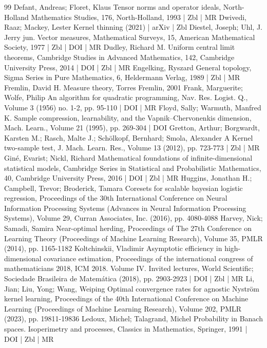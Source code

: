 \begin{thebibliography}{99}
Defant, Andreas; Floret, Klaus Tensor norms and operator ideals, North-Holland Mathematics Studies, 176, North-Holland, 1993 | Zbl | MR
Dwivedi, Raaz; Mackey, Lester Kernel thinning (2021) | arXiv | Zbl
Diestel, Joseph; Uhl, J. Jerry jun. Vector measures, Mathematical Surveys, 15, American Mathematical Society, 1977 | Zbl | DOI | MR
Dudley, Richard M. Uniform central limit theorems, Cambridge Studies in Advanced Mathematics, 142, Cambridge University Press, 2014 | DOI | Zbl | MR
Engelking, Ryszard General topology, Sigma Series in Pure Mathematics, 6, Heldermann Verlag, 1989 | Zbl | MR
Fremlin, David H. Measure theory, Torres Fremlin, 2001
Frank, Marguerite; Wolfe, Philip An algorithm for quadratic programming, Nav. Res. Logist. Q., Volume 3 (1956) no. 1-2, pp. 95-110 | DOI | MR
Floyd, Sally; Warmuth, Manfred K. Sample compression, learnability, and the Vapnik–Chervonenkis dimension, Mach. Learn., Volume 21 (1995), pp. 269-304 | DOI
Gretton, Arthur; Borgwardt, Karsten M.; Rasch, Malte J.; Schölkopf, Bernhard; Smola, Alexander A Kernel two-sample test, J. Mach. Learn. Res., Volume 13 (2012), pp. 723-773 | Zbl | MR
Giné, Evarist; Nickl, Richard Mathematical foundations of infinite-dimensional statistical models, Cambridge Series in Statistical and Probabilistic Mathematics, 40, Cambridge University Press, 2016 | DOI | Zbl | MR
Huggins, Jonathan H.; Campbell, Trevor; Broderick, Tamara Coresets for scalable bayesian logistic regression, Proceedings of the 30th International Conference on Neural Information Processing Systems (Advances in Neural Information Processing Systems), Volume 29, Curran Associates, Inc. (2016), pp. 4080-4088
Harvey, Nick; Samadi, Samira Near-optimal herding, Proceedings of The 27th Conference on Learning Theory (Proceedings of Machine Learning Research), Volume 35, PMLR (2014), pp. 1165-1182
Koltchinskii, Vladimir Asymptotic efficiency in high-dimensional covariance estimation, Proceedings of the international congress of mathematicians 2018, ICM 2018. Volume IV. Invited lectures, World Scientific; Sociedade Brasileira de Matemática (2018), pp. 2903-2923 | DOI | Zbl | MR
Li, Jian; Liu, Yong; Wang, Weiping Optimal convergence rates for agnostic Nyström kernel learning, Proceedings of the 40th International Conference on Machine Learning (Proceedings of Machine Learning Research), Volume 202, PMLR (2023), pp. 19811-19836
Ledoux, Michel; Talagrand, Michel Probability in Banach spaces. Isoperimetry and processes, Classics in Mathematics, Springer, 1991 | DOI | Zbl | MR

\end{thebibliography}
